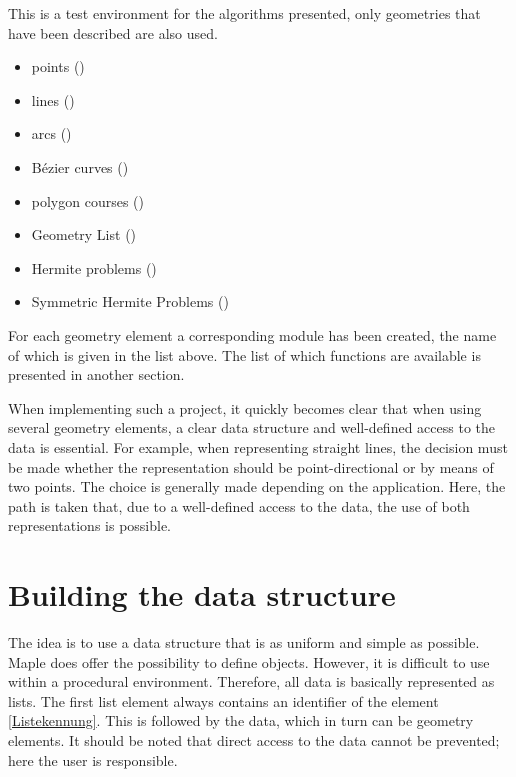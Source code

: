 This is a test environment for the algorithms presented, only geometries that have been described are also used.

\begin{itemize}
    \item points ()
    \item lines ()
    \item arcs ()
    \item Bézier curves ()
    \item polygon courses ()
    \item Geometry List ()
    \item Hermite problems ()
    \item Symmetric Hermite Problems ()
\end{itemize}

For each geometry element a corresponding module has been created, the name of which is given in the list above. The list of which functions are available is presented in another section.

When implementing such a project, it quickly becomes clear that when using several geometry elements, a clear data structure and well-defined access to the data is essential. For example, when representing straight lines, the decision must be made whether the representation should be point-directional or by means of two points. The choice is generally made depending on the application. Here, the path is taken that, due to a well-defined access to the data, the use of both representations is possible.

\section{Building the data structure}

The idea is to use a data structure that is as uniform and simple as possible. Maple does offer the possibility to define objects. However, it is difficult to use within a procedural environment. Therefore, all data is basically represented as lists. The first list element always contains an identifier of the element \ref{Listekennung}. This is followed by the data, which in turn can be geometry elements. It should be noted that direct access to the data cannot be prevented; here the user is responsible.

\bigskip

